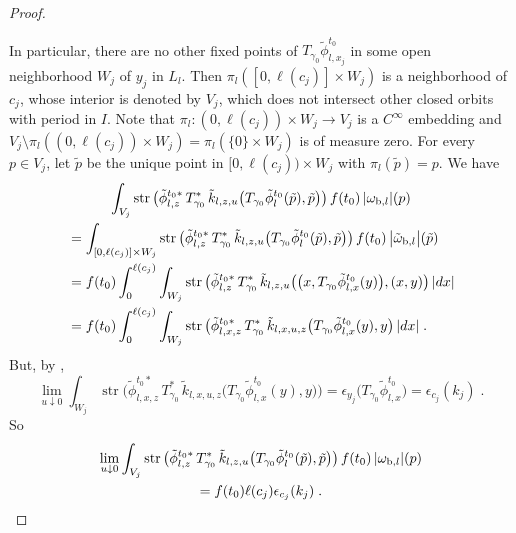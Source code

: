 \documentclass{memo-l}
\theoremstyle{plain}
\theoremstyle{definition}
\theoremstyle{remark}
\newcommand{\str}{\operatorname{str}}
\numberwithin{section}{chapter}
\numberwithin{equation}{section}%
\begin{document}
\begin{proof}
\begin{enumerate}[(A)]
\end{enumerate}
In particular, there are no other fixed points of $T_{\gamma_0}\tilde\phi_{l,x_j}^{t_0}$ in some open neighborhood $W_j$ of $y_j$ in $L_l$. Then $\pi_l([0,\ell(c_j)]\times W_j)$ is a neighborhood of $c_j$, whose interior is denoted by $V_j$, which does not intersect other closed orbits with period in $I$. Note that $\pi_l:(0,\ell(c_j))\times W_j\to V_j$ is a $C^\infty$ embedding and $V_j\setminus\pi_l((0,\ell(c_j))\times W_j)=\pi_l(\{0\}\times W_j)$ is of measure zero. For every $p\in V_j$, let $\tilde p$ be the unique point in $[0,\ell(c_j))\times W_j$ with $\pi_l(\tilde p)=p$. We have
\begin{multline*}
\int_{V_j}\str\big(\tilde\phi_{l,z}^{t_0*}\,T_{\gamma_0}^*\,
\tilde k_{l,z,u}\big(T_{\gamma_0}\tilde\phi_l^{t_0}(\tilde p),\tilde p\big)\big)
\,f(t_0)\,|\omega_{\text{\rm b},l}|(p)\\
\begin{aligned}
&=\int_{[0,\ell(c_j)]\times W_j}\str\big(\tilde\phi_{l,z}^{t_0*}\,T_{\gamma_0}^*\,
\tilde k_{l,z,u}\big(T_{\gamma_0}\tilde\phi_l^{t_0}(\tilde p),\tilde p\big)\big)
\,f(t_0)\,\big|\tilde\omega_{\text{\rm b},l}\big|(\tilde p)\\
&=f(t_0)\int_0^{\ell(c_j)}\int_{W_j}\str
\big(\tilde\phi_{l,z}^{t_0*}\,T_{\gamma_0}^*\,\tilde k_{l,z,u}\big(\big(x,T_{\gamma_0}\tilde\phi_{l,x}^{t_0}(y)\big),(x,y)\big)\,|dx|\\
&=f(t_0)\int_0^{\ell(c_j)}\int_{W_j}\str
\big(\tilde\phi_{l,x,z}^{t_0*}\,T_{\gamma_0}^*\,\tilde k_{l,x,u,z}\big(T_{\gamma_0}\tilde\phi_{l,x}^{t_0}(y),y\big)\,|dx|\;.
\end{aligned}
\end{multline*}
But, by ,
\[
\lim_{u\downarrow0}\int_{W_j}\str
\big(\tilde\phi_{l,x,z}^{t_0*}\,T_{\gamma_0}^*\,\tilde k_{l,x,u,z}\big(T_{\gamma_0}\tilde\phi_{l,x}^{t_0}(y),y\big)\big)
=\epsilon_{y_j}\big(T_{\gamma_0}\tilde\phi_{l,x}^{t_0}\big)=\epsilon_{c_j}(k_j)\;.
\]
So
\begin{multline}\label{lim_u to 0 ... = f(t_0) ell(c_j) varepsilon_c_j(k_j)}
\lim_{u\downarrow0}\int_{V_j}\str\big(\tilde\phi_{l,z}^{t_0*}\,T_{\gamma_0}^*\,
\tilde k_{l,z,u}\big(T_{\gamma_0}\tilde\phi_l^{t_0}(\tilde p),\tilde p\big)\big)\,f(t_0)\,|\omega_{\text{\rm b},l}|(p) \\
=f(t_0)\ell(c_j)\epsilon_{c_j}(k_j)\;.
\end{multline}


\end{proof}
\end{document}
